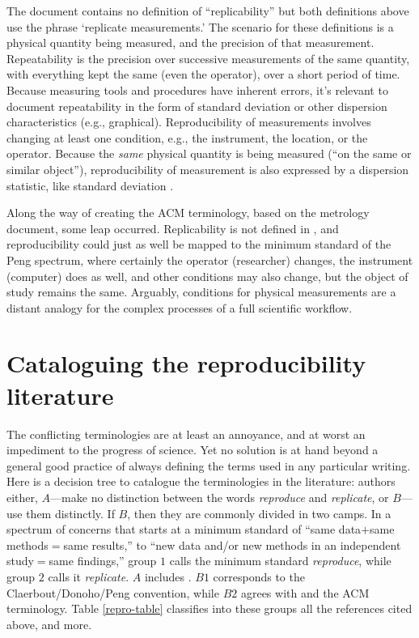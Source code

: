 \documentclass{statement}
\newlength{\up}
\begin{document}
The document contains no definition of ``replicability'' but both definitions above use the phrase `replicate measurements.' The scenario for these definitions is a physical quantity being measured, and the precision of that measurement. Repeatability is the precision over successive measurements of the same quantity, with everything kept the same (even the operator), over a short period of time. 
Because measuring tools and procedures have inherent errors, it's relevant to document repeatability in the form of standard deviation or other dispersion characteristics (e.g., graphical).
Reproducibility of measurements involves changing at least one condition, e.g., the instrument, the location, or the operator. 
Because the \emph{same} physical quantity is being measured (``on the same or similar object''), reproducibility of measurement is also expressed by a dispersion statistic, like standard deviation \cite[p.14]{taylorETal1994}. 

Along the way of creating the ACM terminology, based on the metrology document, some leap occurred. Replicability is not defined in \cite{jcgm2008}, and reproducibility could just as well be mapped to the minimum standard of the Peng spectrum, where certainly the operator (researcher) changes, the instrument (computer) does as well, and other conditions may also change, but the object of study remains the same.
Arguably, conditions for physical measurements are a distant analogy for the complex processes of a full scientific workflow. 

\section*{Cataloguing the reproducibility literature}
\vspace{\up}

The conflicting terminologies are at least an annoyance, and at worst an impediment to the progress of science. Yet no solution is at hand beyond a general good practice of always defining the terms used in any particular writing. 
Here is a decision tree to catalogue the terminologies in the literature: 
authors either, $A$---make no distinction between the words \emph{reproduce} and \emph{replicate}, or $B$---use them distinctly.  
If $B$, then they are commonly divided in two camps. 
In a spectrum of concerns that starts at a minimum standard of ``same data$+$same methods$=$same results,'' to ``new data and/or new methods in an independent study$=$same findings,'' group $1$ calls the minimum standard \emph{reproduce}, while group $2$ calls it \emph{replicate}.
$A$ includes \cite{king1995}.
$B1$ corresponds to the Claerbout/Donoho/Peng convention, while $B2$ agrees with \cite{drummond2009} and the ACM terminology.
Table \ref{repro-table} classifies into these groups all the references cited above, and more.
\end{document}
